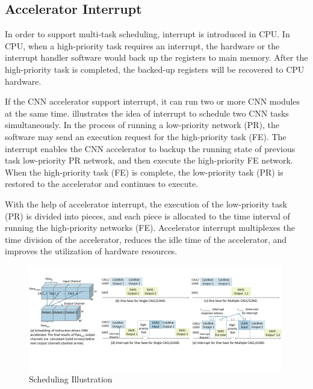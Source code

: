 
\subsection{Accelerator Interrupt}

In order to support multi-task scheduling, interrupt is introduced in CPU. 
In CPU, when a high-priority task requires an interrupt, the hardware or the interrupt handler software would back up the registers to main memory.
After the high-priority task is completed, the backed-up registers will be recovered to CPU hardware. 

If the CNN accelerator support interrupt, it can run two or more CNN modules at the same time.  illustrates the idea of interrupt to schedule two CNN tasks simultaneously. In the process of running a low-priority network (PR), the software may send an execution request for the high-priority task (FE). The interrupt enables the CNN accelerator to backup the running state of previous task low-priority PR network, and then execute the high-priority FE network. When the high-priority task (FE) is complete, the low-priority task (PR) is restored to the accelerator and continues to execute.

With the help of accelerator interrupt, the execution of the low-priority task (PR) is divided into pieces, and each piece is allocated to the time interval of running the high-priority networks (FE). 
Accelerator interrupt multiplexes the time division of the accelerator, reduces the idle time of the accelerator, and improves the utilization of hardware resources. 

\begin{figure}[t]
    \centering
	\includegraphics[width=0.99\textwidth]{fig/singlesave.pdf} 	
    \caption{
		Scheduling Illustration
    }
	\label{fig:singlesave}
\end{figure}


